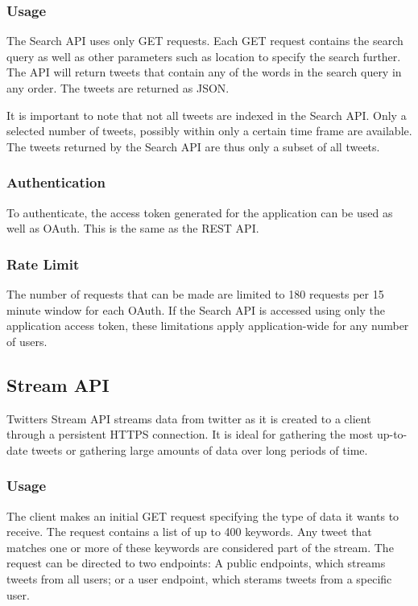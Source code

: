 \subsubsection{Usage}
The Search API uses only GET requests. Each GET request contains the search query as well as other parameters such as location to specify the search further. The API will return tweets that contain any of the words in the search query in any order. The tweets are returned as JSON.\cite{twitter-rest-api}

It is important to note that not all tweets are indexed in the Search API. Only a selected number of tweets, possibly within only a certain time frame are available. The tweets returned by the Search API are thus only a subset of all tweets.\cite{twitter-search-api-timeframe}

\subsubsection{Authentication}
To authenticate, the access token generated for the application can be used as well as OAuth. This is the same as the REST API. \cite{twitter-rest-api}

\subsubsection{Rate Limit}
The number of requests that can be made are limited to 180 requests per 15 minute window for each OAuth. If the Search API is accessed using only the application access token, these limitations apply application-wide for any number of users.\cite{twitter-rate-limiting}

\subsection{Stream API}
Twitters Stream API streams data from twitter as it is created to a client through a persistent HTTPS connection. It is ideal for gathering the most up-to-date tweets or gathering large amounts of data over long periods of time.

\subsubsection{Usage}
The client makes an initial GET request specifying the type of data it wants to receive. The request contains a list of up to 400 keywords. Any tweet that matches one or more of these keywords are considered part of the stream. The request can be directed to two endpoints: A public endpoints, which streams tweets from all users; or a user endpoint, which sterams tweets from a specific user.

